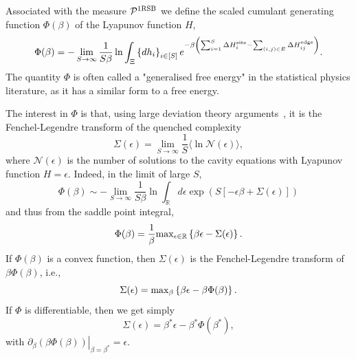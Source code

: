 \documentclass[11pt,a4paper]{article}
\begin{document}
Associated with the measure $\mathcal{P}^{\rm 1RSB}$ we  define the scaled cumulant generating function $\Phi(\beta)$  of the Lyapunov function $H$, 
\begin{equation}
\Phi(\beta)  = -\lim_{S\rightarrow \infty}\frac{1}{S\beta} \ln \int_{\Xi} \left\{d
h_i\right\}_{i\in [S]}  e^{-\beta \left(\sum^S_{i=1}\Delta H^{\rm site}_i - \sum_{(i,j)\in E}\Delta H^{\rm edge}_{ij}\right)}.  
\end{equation}
The quantity $\Phi$ is often called a "generalised free energy" in the statistical physics literature, as it has a similar form to a free energy.  

The interest in $\Phi$ is that, using large deviation theory arguments~\cite{}, it is the Fenchel-Legendre transform of the  quenched complexity 
\begin{equation}
\Sigma(\epsilon) = \lim_{S\rightarrow \infty} \frac{1}{S} \langle \ln \mathcal{N}(\epsilon)\rangle ,
\end{equation}
where  $\mathcal{N}(\epsilon)$ is the number of solutions to the cavity equations with Lyapunov function $H = \epsilon$.      Indeed, in the limit of large $S$, 
\begin{equation}
\Phi(\beta) \sim  -\lim_{S\rightarrow \infty}\frac{1}{S\beta}\ln \int_{\mathbb{R}} d\epsilon \exp\left(S [-\epsilon \beta + \Sigma(\epsilon)]\right)
\end{equation}
and thus from the saddle point integral, 
\begin{equation}
\Phi(\beta) = \frac{1}{\beta}{\rm max}_{\epsilon\in \mathbb{R}}\left\{\beta \epsilon  - \Sigma(\epsilon)\right\}. 
\end{equation} 
If $\Phi(\beta)$ is a convex function, then $\Sigma(\epsilon)$ is the Fenchel-Legendre transform of $\beta \Phi(\beta)$, i.e., 
\begin{equation}
\Sigma(\epsilon) = {\rm max}_{\beta}\left\{\beta \epsilon - \beta  \Phi(\beta)\right\}.
\end{equation}
If $\Phi$ is differentiable, then we get simply 
\begin{equation}
\Sigma(\epsilon) = \beta^\ast \epsilon - \beta^\ast \Phi(\beta^\ast),
\end{equation}   
with $\left.\partial_\beta (\beta \Phi(\beta))\right|_{\beta=\beta^\ast} = \epsilon$. 
\end{document}
